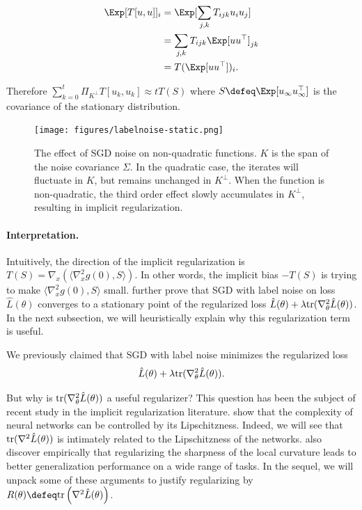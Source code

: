 \begin{align}
\Exp [T[u,u]]_i &= \Exp [\sum_{j,k}T_{ijk}u_iu_j]\\
&= \sum_{j,k}T_{ijk}\Exp[uu^\top]_{jk} \\
&= T(\Exp[uu^\top])_i.
\end{align}

Therefore $\sum_{k=0}^{t}\Pi_{K^\perp}T[u_k,u_k] \approx tT(S)$ where $S \defeq \Exp[u_{\infty}u_{\infty}^\top]$ is the covariance of the stationary distribution.

\begin{figure}[ht]
\texttt{[image: figures/labelnoise-static.png]}
\centering
\caption{The effect of SGD noise on non-quadratic functions. $K$ is the span of the noise covariance $\Sigma$. In the quadratic case, the iterates will fluctuate in $K$, but remains unchanged in $K^\perp$. When the function is non-quadratic, the third order effect slowly accumulates in $K^\perp$, resulting in implicit regularization. } 
\label{lec17:fig:noise}
\end{figure}


\paragraph{Interpretation.} Intuitively, the direction of the implicit regularization is $T(S) = \nabla_x \left(\langle\nabla_x^2g(0), S\rangle\right)$. In other words, the implicit bias $-T(S)$ is trying to make $\langle\nabla^2_x g(0), S\rangle$ small. \cite{damian2021label} further prove that SGD with label noise on loss $\hat{L}(\theta)$ converges to a stationary point of the regularized loss $\hat{L}(\theta) + \lambda \textup{tr}(\nabla^2_\theta \hat{L}(\theta))$. In the next subsection, we will heuristically explain why this regularization term is useful.


We previously claimed that SGD with label noise minimizes the regularized loss 
\begin{equation}
    \hat{L}(\theta) + \lambda \textup{tr}(\nabla^2_\theta \hat{L}(\theta)).
\end{equation} 

But why is $\textup{tr}(\nabla^2_\theta \hat{L}(\theta))$ a useful regularizer? This question has been the subject of recent study in the implicit regularization literature. \cite{wei2019improved} show that the complexity of neural networks can be controlled by its Lipschitzness. Indeed, we will see that $\textup{tr}(\nabla^2\hat{L}(\theta))$ is intimately related to the Lipschitzness of the networks. \cite{foret2020sharpness} also discover empirically that regularizing the sharpness of the local curvature leads to better generalization performance on a wide range of tasks. In the sequel, we will unpack some of these arguments to justify regularizing by $R(\theta) \defeq \textup{tr}\left (\nabla^2 \hat{L}(\theta) \right )$.

